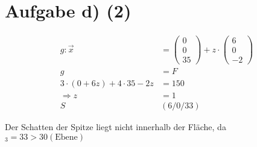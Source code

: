 \documentclass[12pt,a4paper]{report}
\begin{document}
\section{Aufgabe d) (2)}
\begin{align*}
	g: \overrightarrow{x} &= \begin{pmatrix}
		0\\0\\35
	\end{pmatrix} + z \cdot \begin{pmatrix}
		6 \\ 0 \\ -2
	\end{pmatrix} \\
	 g &= F \\
	 3 \cdot (0+6z) +4 \cdot 35-2z &= 150 \\
	 \Rightarrow z &= 1 \\
	 S&(6/0/33)
\end{align*}

Der Schatten der Spitze liegt nicht innerhalb der Fläche, da $_3=33 > 30 (\text{Ebene})$
\end{document}

